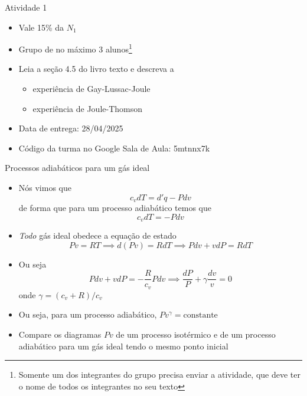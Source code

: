 \documentclass[t,%
brazilian,%
11pt,%
aspectratio=169,%
table%
]{beamer}
\begin{document}
\begin{frame}{Atividade 1}
    \begin{itemize}
        \item Vale 15\% da \(N_1\)
        \item Grupo de no máximo 3 alunos\footnote{Somente um dos integrantes do 
            grupo precisa enviar a atividade, que deve ter o nome de todos os integrantes no seu texto}
        \item Leia a seção 4.5 do livro texto e descreva a
            \begin{itemize}
                \item experiência de Gay-Lussac-Joule
                \item experiência de Joule-Thomson
            \end{itemize}
        \item Data de entrega: 28/04/2025
        \item Código da turma no Google Sala de Aula: 5mtnnx7k
    \end{itemize}
\end{frame}

\begin{frame}{Processos adiabáticos para um gás ideal}
    \begin{itemize}
        \item Nós vimos que
            \[
                c_v dT = d'q - Pdv
            \]
            de forma que para um processo adiabático temos que
            \[
                c_v dT = -Pdv
            \]
            \pause
        \item \textit{Todo} gás ideal obedece a equação de estado
            \[
                Pv = RT \implies d(Pv) = RdT \implies Pdv + vdP = RdT
            \]
        \item Ou seja
            \[
                Pdv + vdP = -\frac{R}{c_v}Pdv \implies
                \frac{dP}{P} + \gamma \frac{dv}{v} = 0
            \]
            onde \(\gamma = (c_v+R)/c_v\)
            \pause
        \item Ou seja, para um processo adiabático, \(Pv^\gamma = \text{constante}\)
        \item Compare os diagramas $Pv$ de um processo isotérmico e de um processo
        adiabático para um gás ideal tendo o mesmo ponto inicial

    \end{itemize}
\end{frame}
\end{document}
